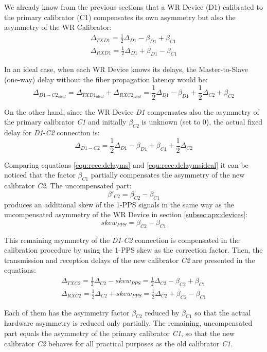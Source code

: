 We already know from the previous sections that a WR Device (D1) calibrated to
the primary calibrator (C1) compensates its own asymmetry but also the asymmetry
of the WR Calibrator:
\begin{align}
	\Delta_{TXD1} = \frac{1}{2}\Delta_{D1} - \beta_{D1} + \beta_{C1} \\
	\Delta_{RXD1} = \frac{1}{2}\Delta_{D1} + \beta_{D1} - \beta_{C1}
\end{align}

In an ideal case, when each WR Device knows its delays, the Master-to-Slave
(one-way) delay without the fiber propagation latency would be:
\begin{equation}
\label{equ:recc:delaymsideal}
	\Delta_{D1-C2_{ideal}} = \Delta_{TXD1_{ideal}} + \Delta_{RXC2_{ideal}} = \frac{1}{2}\Delta_{D1} - \beta_{D1} + \frac{1}{2}\Delta_{C2} + \beta_{C2}
\end{equation}

On the other hand, since the WR Device \emph{D1} compensates also the asymmetry
of the primary calibrator \emph{C1} and initially $\beta_{C2}$ is unknown (set
to 0), the actual fixed delay for \emph{D1}-\emph{C2} connection is:
\begin{equation}
\label{equ:recc:delayms}
	\Delta_{D1-C2} = \frac{1}{2}\Delta_{D1} - \beta_{D1} + \beta_{C1} + \frac{1}{2}\Delta_{C2}
\end{equation}

Comparing equations \ref{equ:recc:delayms} and \ref{equ:recc:delaymsideal} it
can be noticed that the factor $\beta_{C1}$ partially compensates the asymmetry
of the new calibrator \emph{C2}. The uncompensated part:
\begin{equation}
	\beta'_{C2} = \beta_{C2} - \beta_{C1}
\end{equation}
produces an additional skew of the 1-PPS signals in the same way as the
uncompensated asymmetry of the WR Device in section \ref{subsec:apx:devices}:
\begin{equation}
	skew_{PPS} = \beta_{C2} - \beta_{C1}
\end{equation}

This remaining asymmetry of the \emph{D1}-\emph{C2} connection is compensated in
the calibration procedure by using the 1-PPS skew as the correction factor.
Then, the transmission and reception delays of the new calibrator \emph{C2} are
presented in the equations:
\begin{align}
	\Delta_{TXC2} = \frac{1}{2}\Delta_{C2} - skew_{PPS} = \frac{1}{2}\Delta_{C2} - \beta_{C2} + \beta_{C1}\\
	\Delta_{RXC2} = \frac{1}{2}\Delta_{C2} + skew_{PPS} = \frac{1}{2}\Delta_{C2} + \beta_{C2} - \beta_{C1}
\end{align}

Each of them has the asymmetry factor $\beta_{C2}$ reduced by $\beta_{C1}$ so
that the actual hardware asymmetry is reduced only partially. The remaining,
uncompensated part equals the asymmetry of the primary calibrator \emph{C1}, so
that the new calibrator \emph{C2} behaves for all practical purposes as the old
calibrator \emph{C1}.

